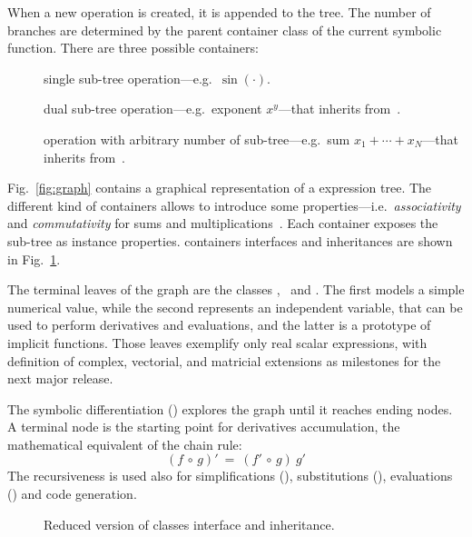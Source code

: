 When a new operation is created, it is appended to the tree. The number of branches are determined by the parent container class of the current symbolic function. There are three possible containers:
\begin{description}
  \item[\CASOp] single sub-tree operation---e.g.~$\sin(\cdot)$.
  \item[\CASBinaryOp] dual sub-tree operation---e.g.~exponent $x^y$---that inherits from~\CASOp.
  \item[\CASNaryOp] operation with arbitrary number of sub-tree---e.g.~sum $x_1 + \cdots + x_N$---that inherits from~\CASOp.
\end{description}
Fig.~\ref{fig:graph} contains a graphical representation of a expression tree. The different kind of containers allows to introduce some properties---i.e.~\emph{associativity} and \emph{commutativity} for sums and multiplications~\cite{cohen2003computer}. Each container exposes the sub-tree as instance properties.  containers interfaces and inheritances are shown in Fig.~\ref{fig:uml-container}. 

The terminal leaves of the graph are the classes \CASConstant, \CASVariable~and \CASFunction. The first models a simple numerical value, while the second represents an independent variable, that can be used to perform derivatives and evaluations, and the latter is a prototype of implicit functions. Those leaves exemplify only real scalar expressions, with definition of complex, vectorial, and matricial extensions as milestones for the next major release.

The symbolic differentiation (\CASOpdiff) explores the graph until it reaches ending nodes. A terminal node is the starting point for derivatives accumulation, the mathematical equivalent of the chain rule:
\begin{equation}
\left( f  \, \circ \, g \right)' \: = \:
\left( f' \, \circ \, g \right) \: g'
\end{equation}
The recursiveness is used also for simplifications (\CASOpsimplify), substitutions (\CASOpsubs), evaluations (\CASOpcall) and code generation.

\begin{figure}[ht!]
\centering

\caption{\label{fig:uml-container}Reduced version of classes interface and inheritance. }
\end{figure}


